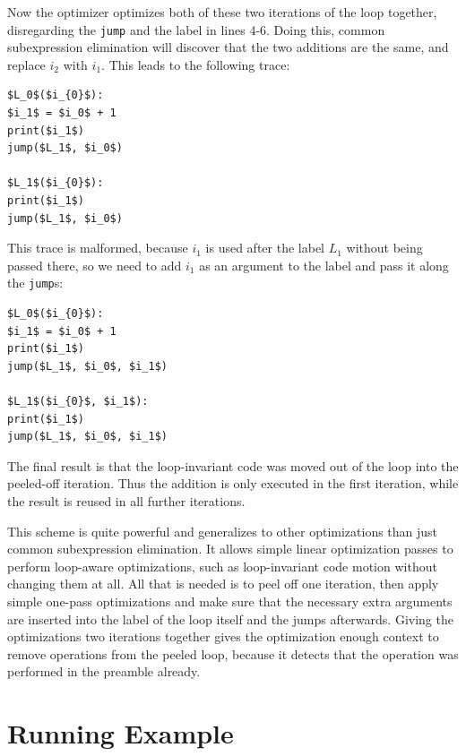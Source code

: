 \documentclass[preprint]{sigplanconf}
\begin{document}
Now the optimizer optimizes both of these two iterations of the loop together,
disregarding the \lstinline{jump} and the label in lines 4-6. Doing this, common
subexpression elimination will discover that the two additions are the same, and
replace $i_2$ with $i_1$. This leads to the following trace:

\begin{lstlisting}[mathescape,numbers = right,basicstyle=\setstretch{1.05}\ttfamily\scriptsize]
$L_0$($i_{0}$):
$i_1$ = $i_0$ + 1
print($i_1$)
jump($L_1$, $i_0$)

$L_1$($i_{0}$):
print($i_1$)
jump($L_1$, $i_0$)
\end{lstlisting}

This trace is malformed, because $i_1$ is used after the label $L_1$ without
being passed there, so we need to add $i_1$ as an argument to the label and pass
it along the \lstinline{jump}s:

\begin{lstlisting}[mathescape,numbers = right,basicstyle=\setstretch{1.05}\ttfamily\scriptsize]
$L_0$($i_{0}$):
$i_1$ = $i_0$ + 1
print($i_1$)
jump($L_1$, $i_0$, $i_1$)

$L_1$($i_{0}$, $i_1$):
print($i_1$)
jump($L_1$, $i_0$, $i_1$)
\end{lstlisting}

The final result is that the loop-invariant code was moved out of the loop into
the peeled-off iteration. Thus the addition is only executed in the first
iteration, while the result is reused in all further iterations.

This scheme is quite powerful and generalizes to other optimizations than just
common subexpression elimination. It allows simple linear optimization passes to
perform loop-aware optimizations, such as loop-invariant code motion without
changing them at all. All that is needed is to peel off one iteration, then
apply simple one-pass optimizations and make sure that the necessary extra
arguments are inserted into the label of the loop itself and the jumps
afterwards. Giving the optimizations two iterations together
gives the optimization enough context to remove operations from the peeled loop,
because it detects that the operation was performed in the preamble already.



\section{Running Example}
\label{sub:example}
\end{document}
